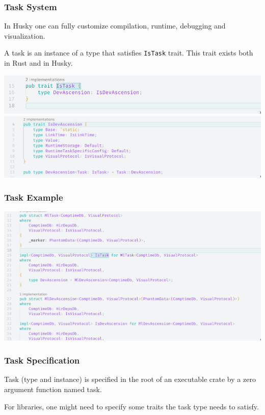 \documentclass{beamer}   	%
\theoremstyle{definition}
\newcommand{\rust}[1]{\texttt{#1}}
\begin{document}
\begin{frame}
\frametitle{Task System}
In Husky one can fully customize compilation, runtime, debugging and visualization.

A task is an instance of a type that satisfies \rust{IsTask} trait. This trait exists both in Rust and in Husky.

\includegraphics[width=\linewidth]{snapshots/husky_is_task_trait.png}
\includegraphics[width=\linewidth]{snapshots/husky_is_dev_ascension_trait.png}
\end{frame}

\begin{frame}
\frametitle{Task Example}
\includegraphics[width=\linewidth]{snapshots/husky_is_task_example_implementation.png}
\end{frame}

\begin{frame}
\frametitle{Task Specification}
Task (type and instance) is specified in the root of an executable crate by a zero argument function named task.

For libraries, one might need to specify some traits the task type needs to satisfy.
\end{frame}
\end{document}
